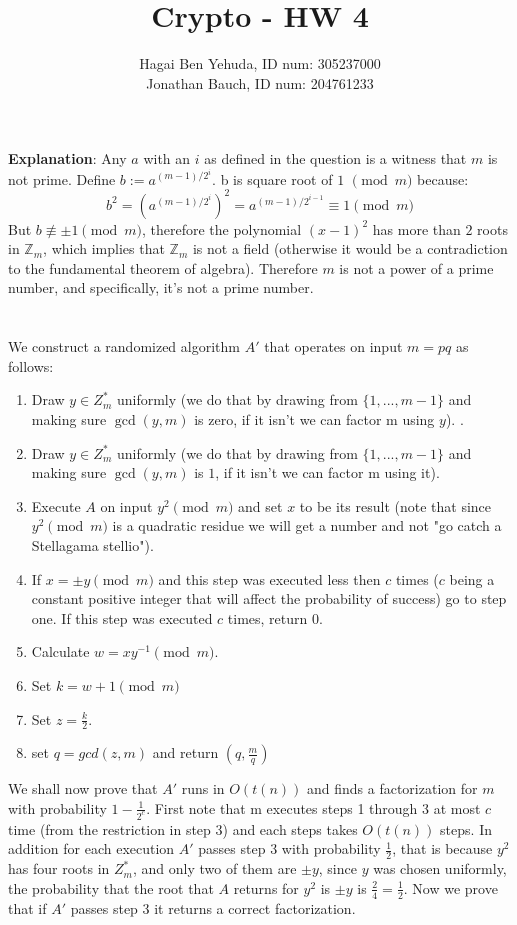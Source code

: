 \documentclass{article}
\title{Crypto - HW 4}
\author{Hagai Ben Yehuda, ID num: 305237000\\ Jonathan Bauch, ID num: 204761233}
\date{}
\begin{document}
  \maketitle

\section{} %


\textbf{Explanation}: Any $a$ with an $i$ as defined in the question is a witness that $m$ is not prime. Define $b := a^{(m-1)/2^i}$.
b is square  root of $1$ $\pmod{m}$ because:
\[ b^2 = (a^{(m-1)/2^i})^2 = a^{(m-1)/2^{i-1}} \equiv 1 \pmod{m} \]
But $b \not \equiv \pm 1 \pmod{m}$, therefore the polynomial $(x-1)^2$ has more than $2$ roots in $\mathbb{Z}_m$, which implies that $\mathbb{Z}_m$ is not a field (otherwise it would be a contradiction to the fundamental theorem of algebra). Therefore $m$ is not a power of a prime number, and specifically, it's not a prime number. 

\section{} %
We construct a randomized algorithm $A'$ that operates on input $m = pq$ as follows:
\begin{enumerate}
\item Draw $y\in Z_{m}^{*}$ uniformly (we do that by drawing from $\{1,...,m-1\}$ and making sure $\gcd(y,m)$ is zero, if it isn't we can factor m using $y$). .
\item Draw $y\in Z_{m}^{*}$ uniformly (we do that by drawing from $\{1,...,m-1\}$ and making sure $\gcd(y,m)$ is $1$, if it isn't we can factor m using it).
\item Execute $A$ on input $y^2 \pmod m $ and set $x$ to be its result (note that since $y^2 \pmod m $ is a quadratic residue we will get a number and not  "go catch a Stellagama stellio"). 
\item If $x = \pm y \pmod m$ and this step was executed less then $c$ times ($c$ being a constant positive integer that will affect the probability of success) go to step one. If this step was executed $c$ times, return $0$.
\item Calculate $w = x  y^{-1} \pmod m$.
\item Set $k = w+1 \pmod m$ 
\item Set $z = \frac{k}{2}$.
\item set $q = gcd(z, m)$ and return $(q, \frac{m}{q})$
\end{enumerate} 
We shall now prove that $A'$ runs in $O(t(n))$ and finds a factorization for $m$ with probability $ 1- \frac{1}{2^c}$.
First note that m executes steps 1 through 3 at most $c$ time (from the restriction in step 3) and each steps takes $O(t(n))$ steps.
In addition for each execution $A'$ passes step $3$ with probability $\frac{1}{2}$, that is because $y^2$ has four roots in $Z_{m}^{*}$, and only two of them are $\pm y$, since $y$ was chosen uniformly, the probability that the root that $A$ returns for $y^2$ is $ \pm y$  is  $\frac{2}{4} = \frac{1}{2}$.
Now we prove that if $A'$ passes step 3 it returns a correct factorization.
\end{document}

